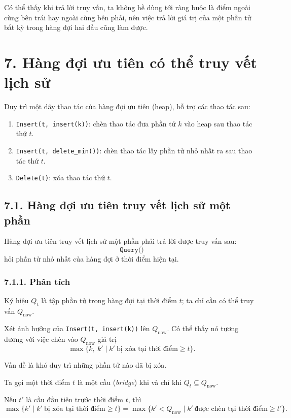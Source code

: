 \documentclass[11pt]{article}
\begin{document}
Có thể thấy khi trả lời truy vấn, ta không hề dùng tới ràng buộc là điểm ngoài
cùng bên trái hay ngoài cùng bên phải, nên việc trả lời giá trị của một phần
tử bất kỳ trong hàng đợi hai đầu cũng làm được.

\section*{7. Hàng đợi ưu tiên có thể truy vết lịch sử}

Duy trì một dãy thao tác của hàng đợi ưu tiên (heap), hỗ trợ các thao tác sau:

\begin{enumerate}
  \item \texttt{Insert(t, insert(k))}: chèn thao tác đưa phần tử \(k\) vào
        heap sau thao tác thứ \(t\).
  \item \texttt{Insert(t, delete\_min())}: chèn thao tác lấy phần tử nhỏ nhất
        ra sau thao tác thứ \(t\).
  \item \texttt{Delete(t)}: xóa thao tác thứ \(t\).
\end{enumerate}

\subsection*{7.1. Hàng đợi ưu tiên truy vết lịch sử một phần}

Hàng đợi ưu tiên truy vết lịch sử một phần phải trả lời được truy vấn sau:
\[
\texttt{Query()}
\]
hỏi phần tử nhỏ nhất của hàng đợi ở thời điểm hiện tại.

\subsubsection*{7.1.1. Phân tích}

Ký hiệu \(Q_t\) là tập phần tử trong hàng đợi tại thời điểm \(t\); ta chỉ cần
có thể truy vấn \(Q_{\mathrm{now}}\).

Xét ảnh hưởng của \texttt{Insert(t, insert(k))} lên \(Q_{\mathrm{now}}\). Có
thể thấy nó tương đương với việc chèn vào \(Q_{\mathrm{now}}\) giá trị
\[
\max\{k,\ k' \mid k'\ \text{bị xóa tại thời điểm}\ge t\}.
\]

Vấn đề là khó duy trì những phần tử nào đã bị xóa.

Ta gọi một thời điểm \(t\) là một cầu (\emph{bridge}) khi và chỉ khi
\(Q_t\subseteq Q_{\mathrm{now}}\).

Nếu \(t'\) là cầu đầu tiên trước thời điểm \(t\), thì
\[
\max\{k' \mid k'\ \text{bị xóa tại thời điểm}\ge t\}
=
\max\{k'<Q_{\mathrm{now}} \mid k'\ \text{được chèn tại thời điểm}\ge t'\}.
\tag{37}
\]
\end{document}
